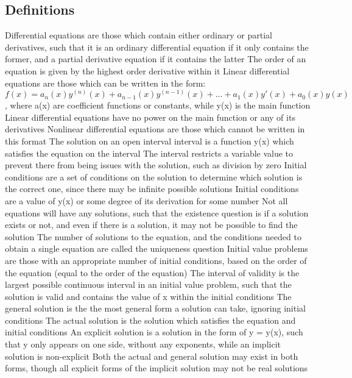 \documentclass[11 pt, twoside]{article}
\newenvironment{outline*}
{
	\begin{outline}[enumerate]
	}
	{\end{outline}
}
\begin{document}
\subsection{Definitions}
\begin{outline*}
\1 Differential equations are those which contain either ordinary or partial derivatives, such that it is an ordinary differential equation if it only contains the former, and a partial derivative equation if it contains the latter
\1 The order of an equation is given by the highest order derivative within it
\1 Linear differential equations are those which can be written in the form: $f(x) = a_n(x)y^{(n)}(x) + a_{n-1}(x)y^{(n-1)}(x) +... + a_1(x)y'(x) + a_0(x)y(x)$, where a(x) are coefficient functions or constants, while y(x) is the main function
\2 Linear differential equations have no power on the main function or any of its derivatives
\2 Nonlinear differential equations are those which cannot be written in this format
\1 The solution on an open interval interval is a function y(x) which satisfies the equation on the interval
\2 The interval restricts a variable value to prevent there from being issues with the solution, such as division by zero
\1 Initial conditions are a set of conditions on the solution to determine which solution is the correct one, since there may be infinite possible solutions
\2 Initial conditions are a value of y(x) or some degree of its derivation for some number
\2 Not all equations will have any solutions, such that the existence question is if a solution exists or not, and even if there is a solution, it may not be possible to find the solution
\2 The number of solutions to the equation, and the conditions needed to obtain a single equation are called the uniqueness question
\1 Initial value problems are those with an appropriate number of initial conditions, based on the order of the equation (equal to the order of the equation)
\1 The interval of validity is the largest possible continuous interval in an initial value problem, such that the solution is valid and contains the value of x within the initial conditions
\1 The general solution is the the most general form a solution can take, ignoring initial conditions
\1 The actual solution is the solution which satisfies the equation and initial conditions
\1 An explicit solution is a solution in the form of y = y(x), such that y only appears on one side, without any exponents, while an implicit solution is non-explicit
\2 Both the actual and general solution may exist in both forms, though all explicit forms of the implicit solution may not be real solutions
\end{outline*}
\end{document}
